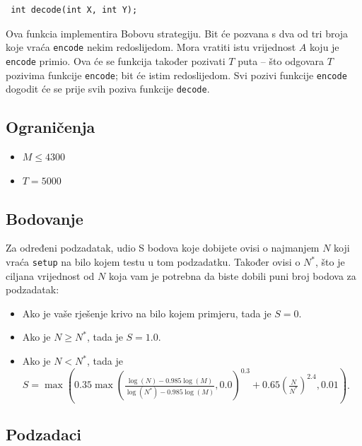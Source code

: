 \documentclass[12pt]{article}
\begin{document}
\begin{lstlisting}
 int decode(int X, int Y);
\end{lstlisting}

Ova funkcia implementira Bobovu strategiju. Bit će pozvana s dva od tri broja koje vraća \texttt{encode} nekim redoslijedom. Mora vratiti istu vrijednost $A$ koju je \texttt{encode} primio. Ova će se funkcija također pozivati $T$ puta -- što odgovara $T$ pozivima funkcije \texttt{encode}; bit će istim redoslijedom. Svi pozivi funkcije \texttt{encode} dogodit će se prije svih poziva funkcije \texttt{decode}.

\subsection{Ograničenja}

\begin{itemize}
\item $M \leq 4300$
\item $T = 5000$
\end{itemize}

\subsection{Bodovanje}

Za određeni podzadatak, udio S bodova koje dobijete ovisi o najmanjem $N$ koji vraća \texttt{setup} na bilo kojem testu u tom podzadatku. Također ovisi o $N^*$, što je ciljana vrijednost od $N$ koja vam je potrebna da biste dobili puni broj bodova za podzadatak:

\begin{itemize}
\item Ako je vaše rješenje krivo na bilo kojem primjeru, tada je $S = 0$.
\item Ako je $N \geq N^*$, tada je $S = 1.0$.
\item Ako je $N < N^*$, tada je $S = \max\left(0.35 \max\left(\frac{\log(N) - 0.985 \log(M)}{\log(N^*) - 0.985 \log(M)}, 0.0\right)^{0.3} + 0.65 \left(\frac{N}{N^*}\right)^{2.4}, 0.01\right)$.
\end{itemize}

\subsection{Podzadaci}
\end{document}
